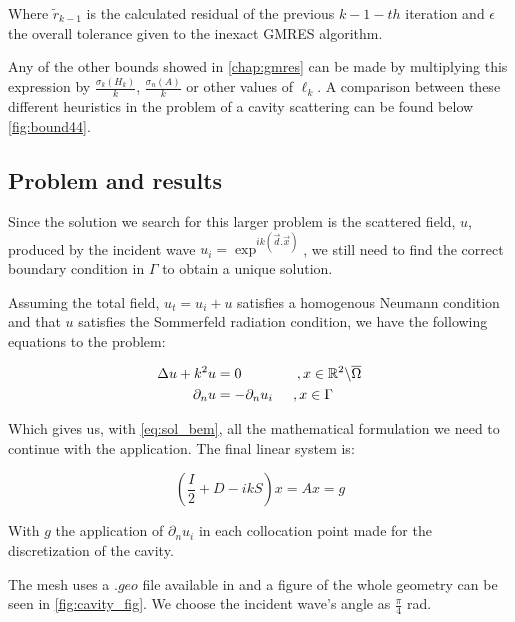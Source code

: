 Where $\tilde{r}_{k-1}$ is the calculated residual of the previous $k-1-th$ iteration and $\epsilon$ the overall tolerance given to the inexact GMRES algorithm.

Any of the other bounds showed in \autoref{chap:gmres} can be made by multiplying this expression by $\frac{\sigma_{k}(H_{k})}{k}$, $\frac{\sigma_{n}(A)}{k}$ or other values of $\ell_{k}$. A comparison between these different heuristics in the problem of a cavity scattering can be found below \ref{fig:bound44}.

\subsection{Problem and results}

Since the solution we search for this larger problem is the scattered field, $u$, produced by the incident wave $u_{i} = \exp^{ik(\vec{d}.\vec{x})}$, we still need to find the correct boundary condition in $\Gamma$ to obtain a unique solution.

Assuming the total field, $u_{t} = u_{i} + u $ satisfies a homogenous Neumann condition and that $u$ satisfies the Sommerfeld radiation condition, we have the following equations to the problem:

\begin{align}\label{eq:cavity_pdes}
    \begin{split}
        \Delta u + k^{2}u &= 0\hspace{0.55in}, x \in \mathbb{R}^{2} \backslash \overline{\Omega} \\
        \partial_{n} u &= -\partial_{n}u_{i}\hspace{0.2in}, x \in \Gamma
    \end{split}
\end{align}

Which gives us, with \ref{eq:sol_bem}, all the mathematical formulation we need to continue with the application. The final linear system is:

\begin{equation}
    \left( \frac{I}{2} + D - ikS \right) x = Ax =g
\end{equation}

With $g$ the application of $\partial_{n} u_{i}$ in each collocation point made for the discretization of the cavity.

The mesh uses a $.geo$ file
available in \cite{git_dudu} and a figure of the whole geometry can be seen in \ref{fig:cavity_fig}. We choose the incident wave's angle as $\frac{\pi}{4}$ rad.

